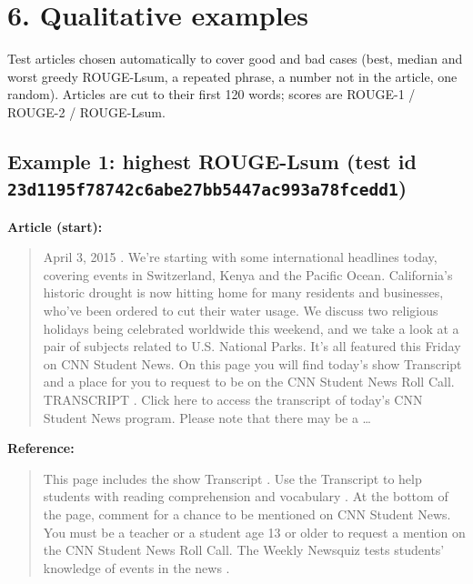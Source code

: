 \documentclass[10pt,a4paper]{article}
\begin{document}
\hypertarget{qualitative-examples}{%
\section{6. Qualitative examples}\label{qualitative-examples}}

Test articles chosen automatically to cover good and bad cases (best, median and worst greedy ROUGE-Lsum, a repeated phrase, a number not in the article, one random). Articles are cut to their first 120 words; scores are ROUGE-1 / ROUGE-2 / ROUGE-Lsum.

\hypertarget{example-1-highest-rouge-lsum-test-id-23d1195f78742c6abe27bb5447ac993a78fcedd1}{%
\subsection{\texorpdfstring{Example 1: highest ROUGE-Lsum (test id \texttt{23d1195f78742c6abe27bb5447ac993a78fcedd1})}{Example 1: highest ROUGE-Lsum (test id 23d1195f78742c6abe27bb5447ac993a78fcedd1)}}\label{example-1-highest-rouge-lsum-test-id-23d1195f78742c6abe27bb5447ac993a78fcedd1}}

\textbf{Article (start):}

\begin{quote}
April 3, 2015 . We're starting with some international headlines today, covering events in Switzerland, Kenya and the Pacific Ocean. California's historic drought is now hitting home for many residents and businesses, who've been ordered to cut their water usage. We discuss two religious holidays being celebrated worldwide this weekend, and we take a look at a pair of subjects related to U.S. National Parks. It's all featured this Friday on CNN Student News. On this page you will find today's show Transcript and a place for you to request to be on the CNN Student News Roll Call. TRANSCRIPT . Click here to access the transcript of today's CNN Student News program. Please note that there may be a \ldots{}
\end{quote}

\textbf{Reference:}

\begin{quote}
This page includes the show Transcript .
Use the Transcript to help students with reading comprehension and vocabulary .
At the bottom of the page, comment for a chance to be mentioned on CNN Student News. You must be a teacher or a student age 13 or older to request a mention on the CNN Student News Roll Call.
The Weekly Newsquiz tests students' knowledge of events in the news .
\end{quote}
\end{document}
